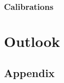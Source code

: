 \documentclass[12pt]{report}
\begin{document}
\subsection{Calibrations}


\chapter{Outlook}



\clearpage


\clearpage
\section{Appendix}
\end{document}

